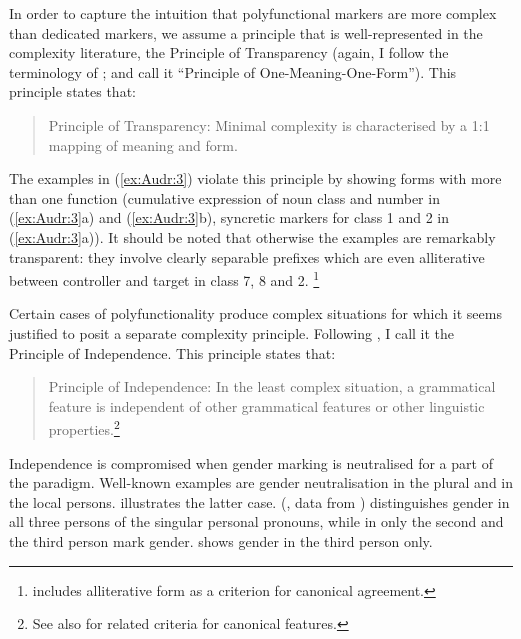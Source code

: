 \documentclass[output=collectionpaper]{langsci/langscibook}
\begin{document}
In order to capture the intuition that polyfunctional markers are more complex than dedicated markers, we assume a principle that is well-represented in the complexity literature, the Principle of Transparency (again, I follow the terminology of \citealt{Kusters2003}; \citealt{Miestamo2008} and  call it ``Principle of One-Meaning-One-Form''). This principle states that:

\begin{quote}
Principle of Transparency: Minimal complexity is characterised by a 1:1 mapping of meaning and form.
\end{quote}

The examples in ‎(\ref{ex:Audr:3}) violate this principle by showing forms with more than one function (cumulative expression of noun class and number in (\ref{ex:Audr:3}a) and ‎(\ref{ex:Audr:3}b), syncretic markers for class 1 and 2 in ‎(\ref{ex:Audr:3}a)). It should be noted that otherwise the  examples are remarkably transparent: they involve clearly separable prefixes which are even alliterative between controller and target in class 7, 8 and 2.%
\footnote{\citet[15]{Corbett2006} includes alliterative form as a criterion for canonical agreement.}

Certain cases of polyfunctionality produce complex situations for which it seems justified to posit a separate complexity principle. Following \citet{DiGarbo2014,DiGarbo2016}, I call it the Principle of Independence. This principle states that:

\begin{quote}
Principle of Independence: In the least complex situation, a grammatical feature is independent of other grammatical features or other linguistic properties.\footnote{See also \citet[170, 174]{Corbett2012} for related criteria for canonical features.}
\end{quote}

Independence is compromised when gender marking is neutralised for a part of the paradigm. Well-known examples are gender neutralisation in the plural and in the local persons.  illustrates the latter case.  (\citealt{Siewierska2013}, data from \citealt{Laycock1965}) distinguishes gender in all three persons of the singular personal pronouns, while in  \citep[298--299]{Ryding2005} only the second and the third person mark gender.  shows gender in the third person only.
\end{document}
